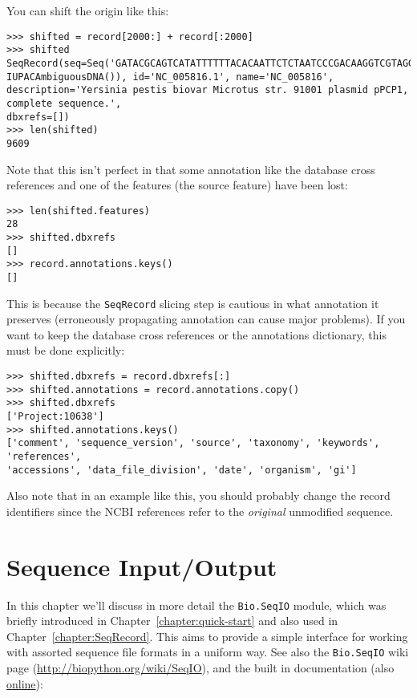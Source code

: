 \documentclass{report}
\begin{document}
You can shift the origin like this:

\begin{verbatim}
>>> shifted = record[2000:] + record[:2000]
>>> shifted
SeqRecord(seq=Seq('GATACGCAGTCATATTTTTTACACAATTCTCTAATCCCGACAAGGTCGTAGGTC...GGA',
IUPACAmbiguousDNA()), id='NC_005816.1', name='NC_005816',
description='Yersinia pestis biovar Microtus str. 91001 plasmid pPCP1, complete sequence.',
dbxrefs=[])
>>> len(shifted)
9609
\end{verbatim}

Note that this isn't perfect in that some annotation like the database cross references
and one of the features (the source feature) have been lost:

\begin{verbatim}
>>> len(shifted.features)
28
>>> shifted.dbxrefs
[]
>>> record.annotations.keys()
[]
\end{verbatim}

This is because the \verb|SeqRecord| slicing step is cautious in what annotation
it preserves (erroneously propagating annotation can cause major problems). If
you want to keep the database cross references or the annotations dictionary,
this must be done explicitly:

\begin{verbatim}
>>> shifted.dbxrefs = record.dbxrefs[:]
>>> shifted.annotations = record.annotations.copy()
>>> shifted.dbxrefs
['Project:10638']
>>> shifted.annotations.keys()
['comment', 'sequence_version', 'source', 'taxonomy', 'keywords', 'references',
'accessions', 'data_file_division', 'date', 'organism', 'gi']
\end{verbatim}

Also note that in an example like this, you should probably change the record
identifiers since the NCBI references refer to the \emph{original} unmodified
sequence.

\chapter{Sequence Input/Output}
\label{chapter:Bio.SeqIO}

In this chapter we'll discuss in more detail the \verb|Bio.SeqIO| module, which was briefly introduced in Chapter~\ref{chapter:quick-start} and also used in Chapter~\ref{chapter:SeqRecord}. This aims to provide a simple interface for working with assorted sequence file formats in a uniform way.
See also the \verb|Bio.SeqIO| wiki page (\url{http://biopython.org/wiki/SeqIO}), and the built in documentation (also \href{http://biopython.org/DIST/docs/api/Bio.SeqIO-module.html}{online}):
\end{document}
